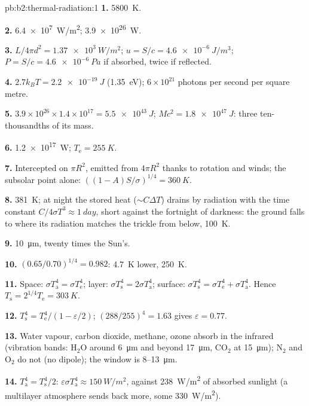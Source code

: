 \begin{solution}{pb:b2:thermal-radiation:1}
\textbf{1.} \qty{5800}{K}.

\textbf{2.} \qty{6.4e7}{W/m^2}; \qty{3.9e26}{W}.

\textbf{3.} $L/4\pi d^2 = \qty{1.37e3}{W/m^2}$; $u = S/c = \qty{4.6e-6}{J/m^3}$;
$P = S/c = \qty{4.6e-6}{Pa}$ if absorbed, twice if reflected.

\textbf{4.} $2.7k_BT = \qty{2.2e-19}{J}$ (\qty{1.35}{eV}); $6 \times 10^{21}$
photons per second per square metre.

\textbf{5.} $3.9 \times 10^{26} \times 1.4 \times 10^{17} = \qty{5.5e43}{J}$; $Mc^2 =
\qty{1.8e47}{J}$: three ten-thousandths of its mass.

\textbf{6.} \qty{1.2e17}{W}; $T_{\text{e}} = \qty{255}{K}$.

\textbf{7.} Intercepted on $\pi R^2$, emitted from $4\pi R^2$ thanks to
rotation and winds; the subsolar point alone: $((1 - A)S/\sigma)^{1/4} =
\qty{360}{K}$.

\textbf{8.} \qty{381}{K}; at night the stored heat ($\sim C\Delta T$) drains by
radiation with the time constant $C/4\sigma T^3 \approx \qty{1}{day}$, short
against the fortnight of darkness: the ground falls to where its
radiation matches the trickle from below, \qty{100}{K}.

\textbf{9.} \qty{10}{\micro m}, twenty times the Sun's.

\textbf{10.} $(0.65/0.70)^{1/4} = 0.982$: \qty{4.7}{K} lower, \qty{250}{K}.

\textbf{11.} Space: $\sigma T_{\text{a}}^4 = \sigma T_{\text{e}}^4$; layer: $\sigma
T_{\text{s}}^4 = 2\sigma T_{\text{a}}^4$; surface: $\sigma T_{\text{s}}^4 = \sigma
T_{\text{e}}^4 + \sigma T_{\text{a}}^4$. Hence $T_{\text{s}} = 2^{1/4}T_{\text{e}} = \qty{303}{K}$.

\textbf{12.} $T_{\text{s}}^4 = T_{\text{e}}^4/(1 - \varepsilon/2)$; $(288/255)^4 = 1.63$
gives $\varepsilon = 0.77$.

\textbf{13.} Water vapour, carbon dioxide, methane, ozone absorb in the
infrared (vibration bands: H$_2$O around \qty{6}{\micro m} and beyond
\qty{17}{\micro m}, CO$_2$ at \qty{15}{\micro m}); N$_2$ and O$_2$ do not (no
dipole); the window is \qty{8}{}--\qty{13}{\micro m}.

\textbf{14.} $T_{\text{a}}^4 = T_{\text{s}}^4/2$: $\varepsilon\sigma T_{\text{a}}^4 \approx
\qty{150}{W/m^2}$, against \qty{238}{W/m^2} of absorbed sunlight (a
multilayer atmosphere sends back more, some \qty{330}{W/m^2}).


\end{solution}
